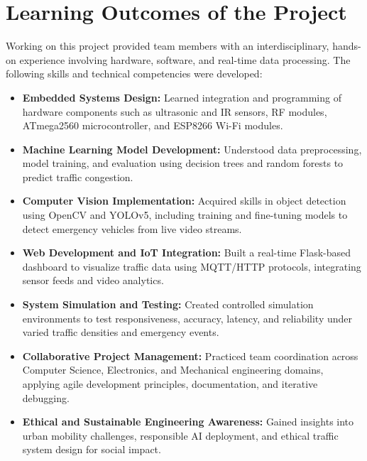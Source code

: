 \documentclass[12pt]{report}
\begin{document}
\section{Learning Outcomes of the Project}

Working on this project provided team members with an interdisciplinary, hands-on experience involving hardware, software, and real-time data processing. The following skills and technical competencies were developed:

\begin{itemize}
    \item \textbf{Embedded Systems Design:} Learned integration and programming of hardware components such as ultrasonic and IR sensors, RF modules, ATmega2560 microcontroller, and ESP8266 Wi-Fi modules.
    
    \item \textbf{Machine Learning Model Development:} Understood data preprocessing, model training, and evaluation using decision trees and random forests to predict traffic congestion.
    
    \item \textbf{Computer Vision Implementation:} Acquired skills in object detection using OpenCV and YOLOv5, including training and fine-tuning models to detect emergency vehicles from live video streams.
    
    \item \textbf{Web Development and IoT Integration:} Built a real-time Flask-based dashboard to visualize traffic data using MQTT/HTTP protocols, integrating sensor feeds and video analytics.
    
    \item \textbf{System Simulation and Testing:} Created controlled simulation environments to test responsiveness, accuracy, latency, and reliability under varied traffic densities and emergency events.
    
    \item \textbf{Collaborative Project Management:} Practiced team coordination across Computer Science, Electronics, and Mechanical engineering domains, applying agile development principles, documentation, and iterative debugging.
    
    \item \textbf{Ethical and Sustainable Engineering Awareness:} Gained insights into urban mobility challenges, responsible AI deployment, and ethical traffic system design for social impact.
\end{itemize}
\end{document}
